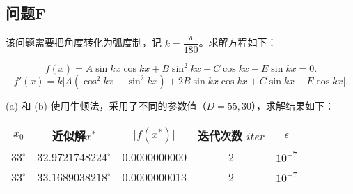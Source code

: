 \documentclass[lang=cn,a4paper,newtx,bibend=bibtex]{elegantpaper}
\begin{document}

\subsection{问题F}

该问题需要把角度转化为弧度制，记 $k = \dfrac{\pi}{180}$。求解方程如下：

\[
  f(x)=A\sin{kx}\cos{kx}+B\sin^2{kx}-C\cos{kx}-E\sin{kx} = 0.
\]
\[
  f'(x)=k\bigg[A(\cos^2{kx}-\sin^2{kx})+2B\sin{kx}\cos{kx}+C\sin{kx}-E\cos{kx}\bigg].
\]

(a) 和 (b) 使用牛顿法，采用了不同的参数值（$D = 55, 30$），求解结果如下：



\begin{table}[htbp]
	\centering
	\begin{tabular}{|c|c|c|c|c|c|}
		\hline
    $x_0$ & 近似解$x^*$ & $\vert f(x^*) \vert$ & 迭代次数 $iter$ & $\epsilon$ \\
    \hline
		$33^\circ$ & $32.9721748224^\circ$ & 0.0000000000 & 2 & $10^{-7}$\\
		\hline
    $33^\circ$ & $33.1689038218^\circ$ & 0.0000000013 & 2 & $10^{-7}$\\
		\hline
	\end{tabular}
\end{table}
\end{document}
